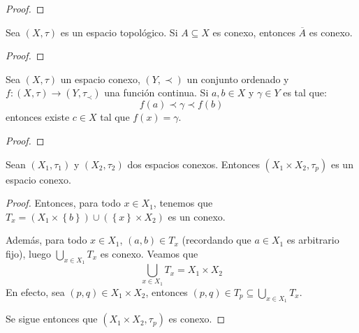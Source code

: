 \documentclass[12pt]{report}
\theoremstyle{largebreak}
\newcommand\cf[3]{\ensuremath{#1:#2\rightarrow#3}}
\newcommand{\Cls}[1]{\ensuremath{\overline{#1}}}
\begin{document}
    \begin{proof}
        
    \end{proof}

    \begin{cor}
        Sea $(X,\tau)$ es un espacio topológico. Si $A\subseteq X$ es conexo, entonces $\Cls{A}$ es conexo.  
    \end{cor}

    \begin{proof}
        
    \end{proof}

    \begin{theor}
        Sea $(X,\tau)$ un espacio conexo, $(Y,\prec)$ un conjunto ordenado y $\cf{f}{(X,\tau)}{(Y,\tau_\prec)}$ una función continua. Si $a,b\in X$ y $\gamma\in Y$ es tal que:
        \begin{equation*}
            f(a)\prec \gamma\prec f(b)
        \end{equation*}
        entonces existe $c\in X$ tal que $f(x)=\gamma$.
    \end{theor}

    \begin{proof}
        
    \end{proof}

    \begin{propo}
        Sean $(X_1,\tau_1)$ y $(X_2,\tau_2)$ dos espacios conexos. Entonces $(X_1\times X_2,\tau_p )$ es un espacio conexo.
    \end{propo}

    \begin{proof}
        

        Entonces, para todo $x\in X_1$, tenemos que $T_x=(X_1\times\left\{b\right\})\cup(\left\{x\right\}\times X_2)$ es un conexo.

        Además, para todo $x\in X_1$, $(a,b)\in T_x$ (recordando que $a\in X_1$ es arbitrario fijo), luego $\bigcup_{ x\in X_1}T_x$ es conexo. Veamos que
        \begin{equation*}
            \bigcup_{ x\in X_1}T_x=X_1\times X_2
        \end{equation*}
        En efecto, sea $(p,q)\in X_1\times X_2$, entonces $(p,q)\in T_p\subseteq\bigcup_{x\in X_1}T_x$.
    
        Se sigue entonces que $(X_1\times X_2,\tau_p)$ es conexo.
    \end{proof}
\end{document}
